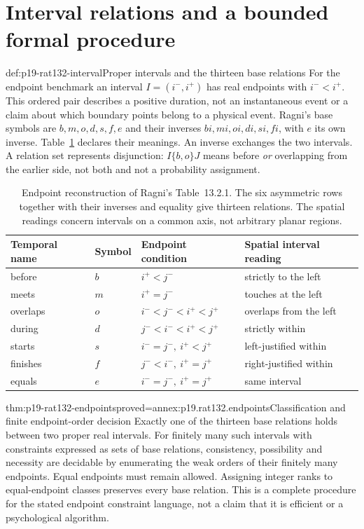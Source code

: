 \section{Interval relations and a bounded formal procedure}
\label{sec:p19-rat132-intervals}

\begin{hbdefinition}{def:p19-rat132-interval}{Proper intervals and the thirteen base relations}
For the endpoint benchmark an interval \(I=(i^-,i^+)\) has real
endpoints with \(i^-<i^+\). This ordered pair describes a positive
duration, not an instantaneous event or a claim about which boundary points
belong to a physical event. Ragni's base symbols are \(b,m,o,d,s,f,e\)
and their inverses \(bi,mi,oi,di,si,fi\), with \(e\) its own
inverse. Table~\ref{tab:p19-rat132-intervals} declares their meanings.
An inverse exchanges the two intervals. A relation set represents
disjunction: \(I\{b,o\}J\) means before \emph{or} overlapping
from the earlier side, not both and not a probability assignment.
\end{hbdefinition}

\begin{table}[htbp]
\centering\small
\begin{tabular}{llll}
Temporal name & Symbol & Endpoint condition & Spatial interval reading\\\hline
before & \(b\) & \(i^+<j^-\) & strictly to the left\\
meets & \(m\) & \(i^+=j^-\) & touches at the left\\
overlaps & \(o\) & \(i^-<j^-<i^+<j^+\) & overlaps from the left\\
during & \(d\) & \(j^-<i^-<i^+<j^+\) & strictly within\\
starts & \(s\) & \(i^-=j^-,\ i^+<j^+\) & left-justified within\\
finishes & \(f\) & \(j^-<i^-,\ i^+=j^+\) & right-justified within\\
equals & \(e\) & \(i^-=j^-,\ i^+=j^+\) & same interval
\end{tabular}
\caption{Endpoint reconstruction of Ragni's Table~13.2.1. The six
asymmetric rows together with their inverses and equality give thirteen
relations. The spatial readings concern intervals on a common axis, not
arbitrary planar regions.}
\label{tab:p19-rat132-intervals}
\end{table}

\begin{hbtheorem}{thm:p19-rat132-endpoints}{proved=annex:p19.rat132.endpoints}{Classification and finite endpoint-order decision}
Exactly one of the thirteen base relations holds between two proper real
intervals. For finitely many such intervals with constraints expressed as
sets of base relations, consistency, possibility and necessity are decidable
by enumerating the weak orders of their finitely many endpoints. Equal
endpoints must remain allowed. Assigning integer ranks to equal-endpoint
classes preserves every base relation. This is a complete procedure for the
stated endpoint constraint language, not a claim that it is efficient or a
psychological algorithm.
\end{hbtheorem}

